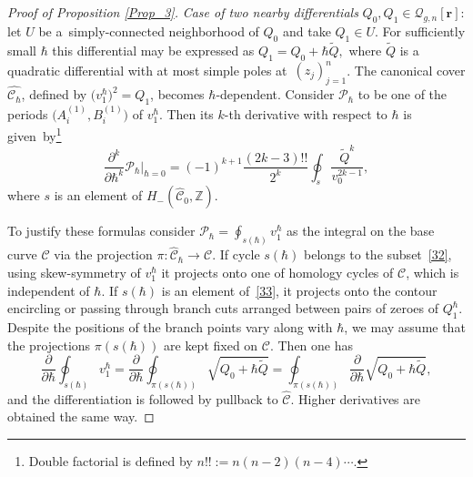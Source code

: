 \documentclass[pdftex]{sigma}
\numberwithin{equation}{section}
\theoremstyle{definition}
\newcommand{\Z}{\mathbb{Z}}
\begin{document}
\begin{proof}[Proof of Proposition \ref{Prop_3}]
\textit{Case of two nearby differentials} $Q_0, Q_1 \in \mathcal{Q}_{g,n}[\mathbf{r}] $: let $U$ be a~sim\-ply-connected neighborhood of $Q_0$ and take $Q_1 \in U.$ For sufficiently small $\hbar$ this differential may be expressed as $Q_1=Q_0+\hbar \tilde{Q},$ where $\tilde{Q}$ is a quadratic differential with at most simple poles at~$(z_j)^{n}_{j=1}$. The canonical cover $\hat{\mathcal{C}_\hbar}$, defined by $\big(v^\hbar_1\big)^2=Q_1$, becomes $\hbar$-dependent. Consider $\mathcal{P}_{\hbar}$ to be one of the periods $\big(A^{(1)}_i,B^{(1)}_i\big)$ of $v^\hbar_1$. Then its $k$-th derivative with respect to $\hbar$ is given~by\footnote{Double factorial is defined by $n!!:=n(n-2)(n-4)\cdots$.}
\begin{equation}\label{101}
\frac{\partial^k }{\partial \hbar^k}\mathcal{P}_{\hbar}\Big|_{\hbar=0} =
(-1)^{k+1}\frac{(2k-3)!!}{2^k}\oint_{s}\frac{\tilde{Q}^k}{v_{0}^{2k-1}},\end{equation}
where $s$ is an element of $H_{-}(\hat{\mathcal{C}}_0, \Z)$.

To justify these formulas consider $ \mathcal{P}_{\hbar}=\oint_{s(\hbar)}v^\hbar_{1}$ as the integral on the base curve $\mathcal{C}$ via the projection $\pi\colon \hat{\mathcal{C}}_\hbar \xrightarrow{} {\mathcal{C}}$. If cycle $s(\hbar)$ belongs to the subset~\eqref{32}, using skew-symmetry of $v^\hbar_1$ it projects onto one of homology cycles of $\mathcal{C}$, which is independent of $\hbar$. If $s(\hbar)$ is an element of~\eqref{33}, it projects onto the contour encircling or passing through branch cuts arranged between pairs of zeroes of $Q^\hbar_{1}$. Despite the positions of the branch points vary along with $\hbar$, we may assume that the projections $\pi(s(\hbar))$ are kept fixed on $\mathcal{C}$. Then one has
\begin{equation*}%
\frac{\partial}{\partial \hbar}\oint_{s(\hbar)}v^\hbar_{1}=\frac{\partial}{\partial \hbar}\oint_{\pi(s(\hbar))}\sqrt{Q_0+\hbar \tilde{Q}}= \oint_{\pi(s(\hbar))}\frac{\partial}{\partial \hbar}\sqrt{Q_0+\hbar\tilde{Q}},
\end{equation*}
and the differentiation is followed by pullback to $\hat{\mathcal{C}}$. Higher derivatives are obtained the same way.


\end{proof}
\end{document}
